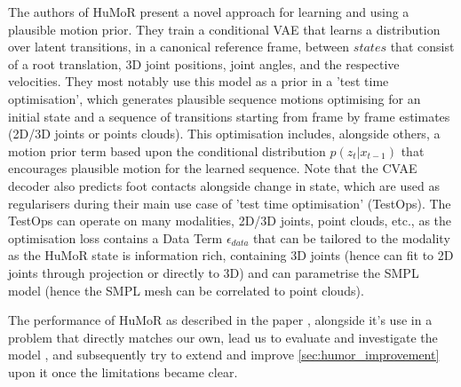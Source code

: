 The authors of HuMoR \cite{humor} present a novel approach for learning and using a plausible motion prior. They train a conditional VAE that learns a distribution over latent transitions, in a canonical reference frame, between $\textit{states}$ that consist of a root translation, 3D joint positions, joint angles, and the respective velocities. They most notably use this model as a prior in a 'test time optimisation', which generates plausible sequence motions optimising for an initial state and a sequence of transitions starting from frame by frame estimates (2D/3D joints or points clouds). This optimisation includes, alongside others, a motion prior term based upon the conditional distribution $p(z_t|x_{t-1})$ that encourages plausible motion for the learned sequence. Note that the CVAE decoder also predicts foot contacts alongside change in state, which are used as regularisers during their main use case of 'test time optimisation' (TestOps). The TestOps can operate on many modalities, 2D/3D joints, point clouds, etc., as the optimisation loss contains a Data Term $\epsilon_{data}$ that can be tailored to the modality as the HuMoR state is information rich, containing 3D joints (hence can fit to 2D joints through projection or directly to 3D) and can parametrise the SMPL model (hence the SMPL mesh can be correlated to point clouds). 

The performance of HuMoR as described in the paper \cite{humor}, alongside it's use in a problem that directly matches our own, lead us to evaluate and investigate the model , and subsequently try to extend and improve \ref{sec:humor_improvement} upon it once the limitations became clear.

